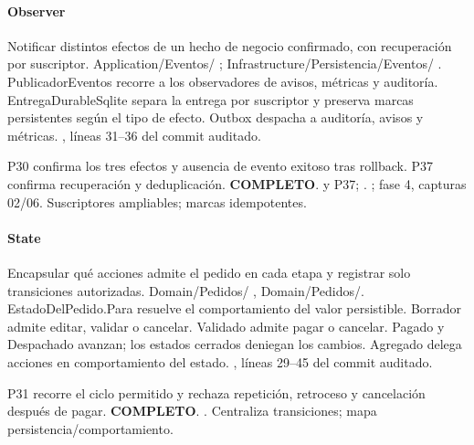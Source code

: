 \paragraph{Observer}
 Notificar distintos efectos de un hecho de negocio confirmado, con recuperación por suscriptor.
 Application/Eventos/ ; Infrastructure/Persistencia/Eventos/ . PublicadorEventos recorre a los observadores de avisos, métricas y auditoría. EntregaDurableSqlite separa la entrega por suscriptor y preserva marcas persistentes según el tipo de efecto.
 Outbox despacha a auditoría, avisos y métricas.
 , líneas 31--36 del commit auditado.

 P30 confirma los tres efectos y ausencia de evento exitoso tras rollback. P37 confirma recuperación y deduplicación. \textbf{COMPLETO}.
  y P37; . ; fase 4, capturas 02/06.
 Suscriptores ampliables; marcas idempotentes.
\medskip
\clearpage
\paragraph{State}
 Encapsular qué acciones admite el pedido en cada etapa y registrar solo transiciones autorizadas.
 Domain/Pedidos/ , Domain/Pedidos/. EstadoDelPedido.Para resuelve el comportamiento del valor persistible. Borrador admite editar, validar o cancelar. Validado admite pagar o cancelar. Pagado y Despachado avanzan; los estados cerrados deniegan los cambios.
 Agregado delega acciones en comportamiento del estado.
 , líneas 29--45 del commit auditado.

 P31 recorre el ciclo permitido y rechaza repetición, retroceso y cancelación después de pagar. \textbf{COMPLETO}.
 .
 Centraliza transiciones; mapa persistencia/comportamiento.
\medskip
\clearpage
